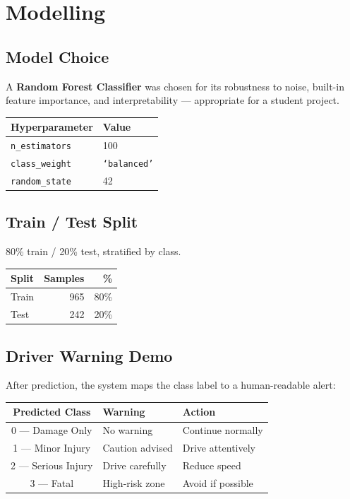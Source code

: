 \documentclass[12pt,a4paper]{article}
\begin{document}
\section{Modelling}

\subsection{Model Choice}
A \textbf{Random Forest Classifier} was chosen for its robustness to noise, built-in feature importance, and interpretability — appropriate for a student project.

\begin{center}
\begin{tabular}{ll}
\toprule
\textbf{Hyperparameter} & \textbf{Value} \\
\midrule
\texttt{n\_estimators}  & 100 \\
\texttt{class\_weight}  & \texttt{`balanced'} \\
\texttt{random\_state}  & 42 \\
\bottomrule
\end{tabular}
\end{center}

\subsection{Train / Test Split}
80\% train / 20\% test, stratified by class.

\begin{center}
\begin{tabular}{lrr}
\toprule
\textbf{Split} & \textbf{Samples} & \textbf{\%} \\
\midrule
Train & 965 & 80\% \\
Test  & 242 & 20\% \\
\bottomrule
\end{tabular}
\end{center}

\subsection{Driver Warning Demo}
After prediction, the system maps the class label to a human-readable alert:

\begin{center}
\begin{tabular}{cll}
\toprule
\textbf{Predicted Class} & \textbf{Warning} & \textbf{Action} \\
\midrule
0 — Damage Only    & No warning          & Continue normally \\
1 — Minor Injury   & Caution advised     & Drive attentively \\
2 — Serious Injury & Drive carefully     & Reduce speed \\
3 — Fatal          & High-risk zone      & Avoid if possible \\
\bottomrule
\end{tabular}
\end{center}
\end{document}
